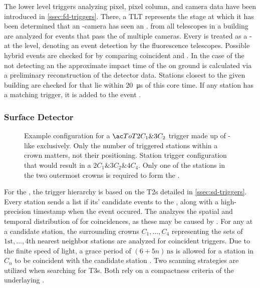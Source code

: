 The lower level triggers analyzing pixel, pixel column, and camera data have 
been introduced in \cref{ssec:fd-triggers}. There, a \acf{TLT} represents the 
stage at which it has been determined that an \FD-camera has seen an \EAS.
\TLTs from all telescopes in a building are analyzed for events that pass the 
\FOV of multiple cameras. Every \TLT is treated as a \FD-\TTHREE at the \CDAS 
level, denoting an \EAS event detection by the fluorescence telescopes. 
Possible hybrid events are checked for by comparing coincident \FD and \SD 
\TTHREEs. In the case of the \SD not detecting an \EAS the approximate impact 
time of the \EAS on ground is calculated via a preliminary reconstruction of 
the \FD detector data. Stations closest to the given \FD building are checked 
for \TTWOs that lie within \SI{20}{\micro\second} of this core time. If any 
station has a matching trigger, it is added to the event
\cite{abrahamFluorescenceDetectorPierre2010, 
thepierreaugercollaborationPierreAugerCosmic2015}.

\subsubsection{Surface Detector}

\begin{figure}[t]
  \centering
  \hspace{0.2cm}
  \caption[]{ Example configuration for a 
  $\ToT2C_1\&3C_2$ \TTHREE trigger made up of \ToT-like \TTWOs exclusively. 
  Only the number of triggered stations within a crown matters, not their 
  positioning.  Station trigger configuration that 
  would result in a $2C_1\&3C_2\&4C_4$. Only one of the stations in the two 
  outermost crowns is required to form the \TTHREE.}
  \label{fig:}
\end{figure}

For the \SD, the trigger hierarchy is based on the \acfp{T2} detailed in 
\cref{ssec:sd-triggers}. Every station sends a list if its' \TTWO candidate 
events to the \CDAS, along with a high-precision timestamp when the event 
occured. The \CDAS analzyes the spatial and temporal distribution of \TTWOs for
coincidences, as these may be caused by \EASs. For any \TTWO at a candidate 
station, the surrounding crowns $C_1, ..., C_4$ representing the sets of  
$1\mathrm{st}, ..., 4\mathrm{th}$ nearest neighbor stations are analyzed for 
coincident \TTWO triggers. Due to the finite speed of light, a grace period of 
$(6 + 5n)\,\mathrm{ns}$ is allowed for a station in $C_n$ to be coincident with
the candidate station \cite{abrahamTriggerApertureSurface2010}. Two scanning 
strategies are utilized when searching for \acfp{T3}. Both rely on a 
compactness criteria of the underlaying \TTWOs.

